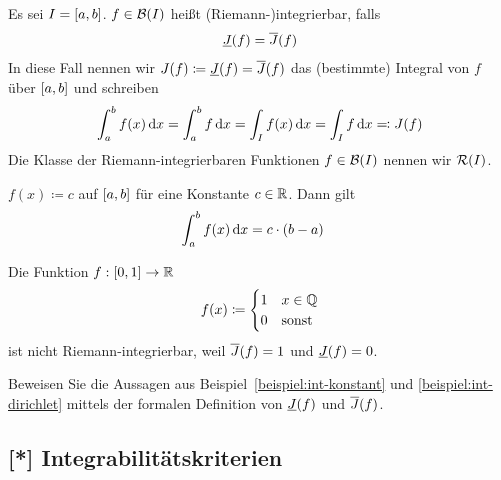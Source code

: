 \begin{definition}[Integral]
    Es sei $I=\left[a,b\right]$. $f\in \mB\of{I}$ heißt (Riemann-)integrierbar, falls
    \begin{align*}
        \underline{J}\of{f} = \overline{J}\of{f}
    \end{align*}
    In diese Fall nennen wir $J(f) \coloneqq \underline{J}\of{f} = \overline{J}\of{f}$ das (bestimmte) Integral von $f$ über $\left[a,b\right]$ und schreiben
    \begin{align*}
        \int_{a}^{b} f(x) \mathop{}\!\mathrm{d} x = \int_{a}^{b} f\mathop{}\!\mathrm{d} x = \int_{I} f(x)\mathop{}\!\mathrm{d} x = \int_{I} f\mathop{}\!\mathrm{d} x \eqqcolon J(f)
    \end{align*}
    Die Klasse der Riemann-integrierbaren Funktionen $f\in \mB\of{I}$ nennen wir $\mR\of{I}$.
\end{definition}

\begin{beispiel}
    \marginnote{[18. Apr]}
    \label{beispiel:int-konstant}
    $f(x) \coloneqq c$ auf $\left[a,b\right]$ für eine Konstante $c\in\mathbb{R}$. Dann gilt
    \begin{align*}
        \int_{a}^{b} f\of{x} \dif x &= c\cdot\pair{b-a}
    \end{align*}
\end{beispiel}

\begin{beispiel}
    \label{beispiel:int-dirichlet}
    Die Funktion $f: \left[0,1\right]\rightarrow{}\mathbb{R}$
    \begin{align*}
        f(x) \coloneqq \begin{cases}
                            1 &x\in \mathbb{Q}\\
                            0 &\text{sonst}
        \end{cases}
    \end{align*}
    ist nicht Riemann-integrierbar, weil $\overline{J}\of{f} = 1$ und $\underline{J}\of{f} = 0$.
\end{beispiel}

\begin{uebung}
    Beweisen Sie die Aussagen aus Beispiel~\ref{beispiel:int-konstant} und \ref{beispiel:int-dirichlet} mittels der formalen Definition von $\un{J}\of{f}$ und $\ov{J}\of{f}$.
\end{uebung}

\subsection{[*] Integrabilitätskriterien}

